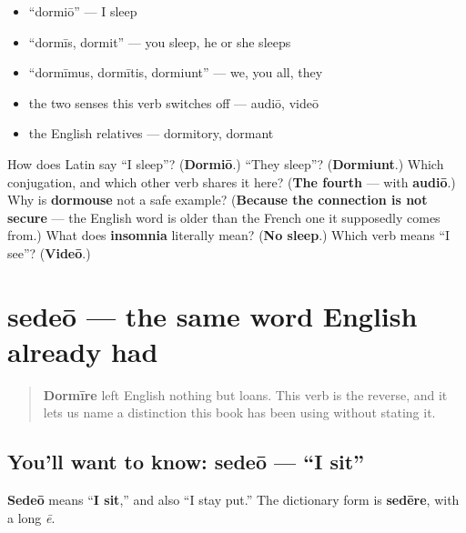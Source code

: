 \begin{itemize}
\raggedright
  \item \textquotedblleft{}dormiō\textquotedblright{} — I sleep
  \item \textquotedblleft{}dormīs, dormit\textquotedblright{} — you sleep, he or she sleeps
  \item \textquotedblleft{}dormīmus, dormītis, dormiunt\textquotedblright{} — we, you all, they
  \item the two senses this verb switches off — audiō, videō
  \item the English relatives — dormitory, dormant
\end{itemize}

\begin{tcolorbox}[breakable,colback=teal!4,colframe=teal!35!black,title={Before you move on}]
How does Latin say \textquotedblleft{}I sleep\textquotedblright{}? (\textbf{Dormiō}.) \textquotedblleft{}They sleep\textquotedblright{}? (\textbf{Dormiunt}.) Which conjugation, and which other verb shares it here? (\textbf{The fourth} — with \textbf{audiō}.) Why is \textbf{dormouse} not a safe example? (\textbf{Because the connection is not secure} — the English word is older than the French one it supposedly comes from.) What does \textbf{insomnia} literally mean? (\textbf{No sleep}.) Which verb means \textquotedblleft{}I see\textquotedblright{}? (\textbf{Videō}.)
\end{tcolorbox}
\section[sedeō, sedēre]{sedeō — the same word English already had}

\label{lesson:LA-C40-sedeo}



\begin{quote}
\textbf{Dormīre} left English nothing but loans. This verb is the reverse, and it lets us name a distinction this book has been using without stating it.
\end{quote}

\subsection*{You'll want to know: sedeō — \textquotedblleft{}I sit\textquotedblright{}}
\textbf{Sedeō} means \textquotedblleft{}\textbf{I sit},\textquotedblright{} and also \textquotedblleft{}I stay put.\textquotedblright{} The dictionary form is \textbf{sedēre}, with a long \emph{ē}.

